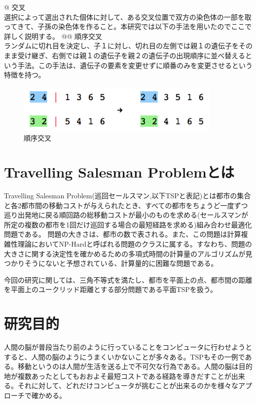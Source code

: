 \documentclass[a4paper, 11pt]{jsarticle}
\begin{document}
\begin{easylist}[itemize]
		@ 交叉 \\
			選択によって選出された個体に対して、ある交叉位置で双方の染色体の一部を取ってきて、子孫の染色体を作ること。本研究では以下の手法を用いたのでここで詳しく説明する。
			@@ 順序交叉 \\
				ランダムに切れ目を決定し、子１に対し、切れ目の左側では親１の遺伝子をそのまま受け継ぎ、右側では親１の遺伝子を親２の遺伝子の出現順序に並べ替えるという手法。この手法は、遺伝子の要素を変更せずに順番のみを変更させるという特徴を持つ。
				\begin{figure}[htbp]
					\begin{center}
						\includegraphics[width=10cm]{img/order_crossover.png}
						\caption{順序交叉}
						\label{crossover}
					\end{center}
				\end{figure}
	\end{easylist}

\pagebreak

	\section{Travelling Salesman Problemとは}

	Travelling Salesman Problem(巡回セールスマン,以下TSPと表記)とは都市の集合と各2都市間の移動コストが与えられたとき、すべての都市をちょうど一度ずつ巡り出発地に戻る順回路の総移動コストが最小のものを求める(セールスマンが所定の複数の都市を1回だけ巡回する場合の最短経路を求める)組み合わせ最適化問題である。
	問題の大きさは、都市の数で表される。また、この問題は計算複雑性理論においてNP-Hardと呼ばれる問題のクラスに属する。すなわち、問題の大きさに関する決定性を確かめるための多項式時間の計算量のアルゴリズムが見つかりそうにないと予想されている、計算量的に困難な問題である。 \newline

	今回の研究に関しては、三角不等式を満たし、都市を平面上の点、都市間の距離を平面上のユークリッド距離とする部分問題である平面TSPを扱う。

	\section{研究目的}

	人間の脳が普段当たり前のように行っていることをコンピュータに行わせようとすると、人間の脳のようにうまくいかないことが多々ある。TSPもその一例である。移動というのは人間が生活を送る上で不可欠な行為である。人間の脳は目的地が複数あったとしてもおおよそ最短コストである経路を導きだすことが出来る。それに対して、どれだけコンピュータが挑むことが出来るのかを様々なアプローチで確かめる。
\end{document}
